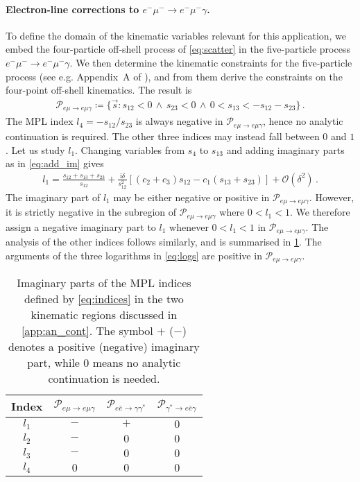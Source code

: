 \paragraph{Electron-line corrections to $e^- \mu^- \to e^- \mu^- \gamma$.}
To define the domain of the kinematic variables relevant for this application, 
we embed the four-particle off-shell process of \cref{eq:scatter} in the five-particle process $e^- \mu^- \to e^- \mu^- \gamma$. We then determine the kinematic constraints for the five-particle process (see e.g. Appendix~A of ), and from them derive the constraints on the four-point off-shell kinematics. The result is
\begin{align}
\label{eq:region_emu-emugamma}
\mathcal{P}_{e\mu\to{e}\mu\gamma} \coloneqq \{\vec{s} \colon s_{12} < 0 \, \land \, s_{23} < 0 \, \land \, 0 < s_{13} < -s_{12} - s_{23} \} \,.
\end{align}
The \ac{MPL} index $l_4 = - s_{12}/s_{23}$ is always negative in $\mathcal{P}_{{e}\mu\to{e}\mu\gamma}$, hence no analytic continuation is required. The other three indices may instead fall between $0$ and $1$. Let us study $l_1$. Changing variables from $s_4$ to $s_{13}$ and adding imaginary parts as in \cref{eq:add_im} gives
\begin{align}
l_1 = \frac{s_{12} + s_{13} + s_{23}}{s_{12}} +  \frac{\mathrm{i} \delta}{s_{12}^2} \left[ (c_2 + c_3) s_{12} - c_1 (s_{13} + s_{23}) \right] + \mathcal{O}\left(\delta^2\right) \,.
\end{align}
The imaginary part of $l_1$ may be either negative or positive in $\mathcal{P}_{{e}\mu\to{e}\mu\gamma} $. However, it is strictly negative in the subregion of $\mathcal{P}_{{e}\mu\to{e}\mu\gamma} $ where $0<l_1<1$. We therefore assign a negative imaginary part to $l_1$ whenever $0<l_1<1$ in $\mathcal{P}_{{e}\mu\to{e}\mu\gamma} $. The analysis of the other indices follows similarly, and is summarised in \cref{tab:an_cont}.
The arguments of the three logarithms in \cref{eq:logs} are positive in $\mathcal{P}_{e\mu\to{e}\mu\gamma}$.

\begin{table}
    \centering
    \begin{tabular}{cccc}
        \hline
        Index & $\mathcal{P}_{{e}\mu\to{e}\mu\gamma}$ & $\mathcal{P}_{{e}\bar{{e}}\to\gamma \gamma^*}$ & $\mathcal{P}_{\gamma^*\to e \bar{e} \gamma}$  \\
        \hline
        $l_1$  & $-$ & $+$ & $0$ \\
        $l_2$  & $-$ & $0$ & $0$ \\
        $l_3$  & $-$ & $0$ & $0$ \\
        $l_4$  & $0$ & $0$ & $0$ \\
        \hline
    \end{tabular}
    \caption{Imaginary parts of the \ac{MPL} indices defined by \cref{eq:indices} in the two kinematic regions discussed in \cref{app:an_cont}. The symbol $+$ ($-$) denotes a positive (negative) imaginary part, while $0$ means no analytic continuation is needed.}
    \label{tab:an_cont}
\end{table}

